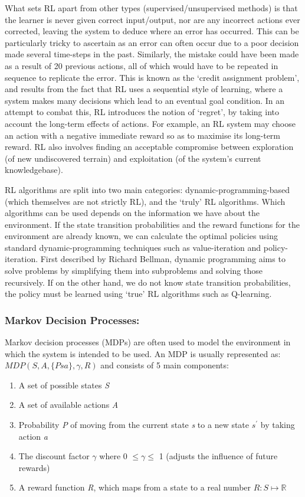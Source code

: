 \documentclass[a4paper,oneside]{report}
\begin{document}
What sets RL apart from other types (supervised/unsupervised methods) is that the learner is never given correct input/output, nor are any incorrect actions ever corrected, leaving the system to deduce where an error has occurred. This can be particularly tricky to ascertain as an error can often occur due to a poor decision made several time-steps in the past. Similarly, the mistake could have been made as a result of 20 previous actions, all of which would have to be repeated in sequence to replicate the error. This is known as the `credit assignment problem', and results from the fact that RL uses a sequential style of learning, where a system makes many decisions which lead to an eventual goal condition. In an attempt to combat this, RL introduces the notion of `regret', by taking into account the long-term effects of actions. For example, an RL system may choose an action with a negative immediate reward so as to maximise its long-term reward. RL also involves finding an acceptable compromise between exploration (of new undiscovered terrain) and exploitation (of the system's current knowledgebase).

RL algorithms are split into two main categories: dynamic-programming-based (which themselves are not strictly RL), and the `truly' RL algorithms. Which algorithms can be used depends on the information we have about the environment. If the state transition probabilities and the reward functions for the environment are already known, we can calculate the optimal policies using standard dynamic-programming techniques such as value-iteration and policy-iteration. First described by Richard Bellman, dynamic programming aims to solve problems by simplifying them into subproblems and solving those recursively. If on the other hand, we do not know state transition probabilities, the policy must be learned using `true' RL algorithms such as Q-learning.

\subsubsection{Markov Decision Processes:}

Markov decision processes (MDPs) are often used to model the environment in which the system is intended to be used. An MDP is usually represented as: $MDP(S, A, \{Psa\}, \gamma, R)$ and consists of 5 main components: 

\begin{enumerate}
	\item A set of possible states \emph{S}
	\item A set of available actions \emph{A}
	\item Probability \emph{P} of moving from the current state \emph{s} to a new state \emph{$s^\prime$} by taking action \emph{a}
	\item The discount factor $\gamma$ where 0 $\leq \gamma \leq$ 1 (adjusts the influence of future rewards)
	\item A reward function \emph{R}, which maps from a state to a real number $R : S \mapsto \mathbb{R}$ 
\end{enumerate}
\end{document}
